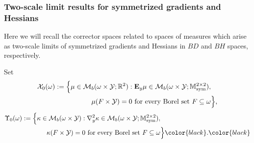 \documentclass[reqno,10pt]{amsart}
\numberwithin{equation}{section}
\theoremstyle{remark}
\newcommand{\RED}{\color{black}}
\newcommand{\BLACK}{\color{black}}
\newcommand{\M}{\mathbb{M}}
\newcommand{\R}{\mathbb{R}}
\newcommand{\calY}{\mathcal{Y}}
\DeclareMathOperator{\sym}{sym}
\newcommand{\Mb}{\mathcal{M}_b}
\newcommand{\calXzero}[1]{\mathcal{X}_0({#1})}
\newcommand{\calYzero}[1]{\Upsilon_0({#1})}
\newcommand{\E}{{\bf E}}
\newcommand{\D}{\nabla}
\begin{document}
\subsubsection{Two-scale limit results for symmetrized gradients and Hessians} \label{section two-scale limits and correctors}
Here we will recall the corrector spaces 
related to spaces of measures which arise as two-scale limits of symmetrized gradients and Hessians in $BD$ and $BH$ spaces, respectively. 

Set
\begin{align*}
	\calXzero{\omega} := \Big\{\mu \in \Mb(\omega \times \calY;\R^2) : {\E}_{y}\mu \in \Mb(\omega \times \calY;\M^{2 \times 2}_{\sym}),& \\
	\mu(F \times \calY) = 0 \textrm{ for every Borel set } F \subseteq \omega & \Big\},
\end{align*}
\begin{align*}
	\calYzero{\omega} := \Big\{\kappa \in \Mb(\omega \times \calY) : {\D}^2_{y}\kappa \in \Mb(\omega \times \calY;\M^{2 \times 2}_{\sym}),& \\
	\kappa(F \times \calY) = 0 \textrm{ for every Borel set } F \subseteq \omega & \Big\}{\RED.\BLACK}
\end{align*}
\end{document}
